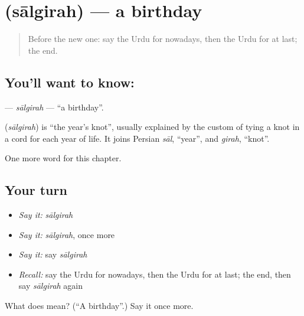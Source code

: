\section[\texorpdfstring{\ur{سالگرہ} (sālgirah)}{سالگرہ (sālgirah)}]{ (sālgirah) — a birthday}

\label{lesson:UR-C245-salgirah}



\begin{quote}
Before the new one: say the Urdu for nowadays, then the Urdu for at last; the end.
\end{quote}

\subsection*{You'll want to know: }
\textbf{} — \emph{sālgirah} — \textquotedblleft{}a birthday\textquotedblright{}.

\begin{cousinweb}
\textbf{} (\emph{sālgirah}) is \textquotedblleft{}the year's knot\textquotedblright{}, usually explained by the custom of tying a knot in a cord for each year of life. It joins Persian \emph{sāl}, \textquotedblleft{}year\textquotedblright{}, and \emph{girah}, \textquotedblleft{}knot\textquotedblright{}.
\end{cousinweb}

\begin{grammarlens}[title={What you've built}]
One more word for this chapter.
\end{grammarlens}

\subsection*{Your turn}
\begin{itemize}
\raggedright
  \item \emph{Say it:} \emph{sālgirah}
  \item \emph{Say it:} \emph{sālgirah}, once more
  \item \emph{Say it:} say \emph{sālgirah}
  \item \emph{Recall:} say the Urdu for nowadays, then the Urdu for at last; the end, then say \emph{sālgirah} again
\end{itemize}

\begin{tcolorbox}[breakable,colback=teal!4,colframe=teal!35!black,title={Before you move on}]
What does  mean? (\textquotedblleft{}A birthday\textquotedblright{}.) Say it once more.
\end{tcolorbox}
